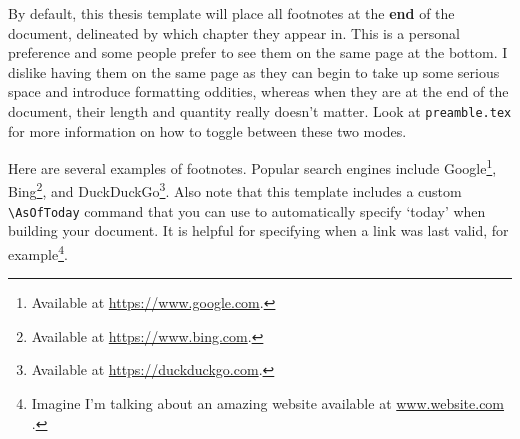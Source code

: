 By default, this thesis template will place all footnotes at the \textbf{end} of the document, delineated by which chapter they appear in.
This is a personal preference and some people prefer to see them on the same page at the bottom.
I dislike having them on the same page as they can begin to take up some serious space and introduce formatting oddities, whereas when they are at the end of the document, their length and quantity really doesn't matter.
Look at \verb|preamble.tex| for more information on how to toggle between these two modes.

Here are several examples of footnotes.
Popular search engines include Google\footnote{Available at \url{https://www.google.com}.}, Bing\footnote{Available at \url{https://www.bing.com}.}, and DuckDuckGo\footnote{Available at \url{https://duckduckgo.com}.}.
Also note that this template includes a custom \verb|\AsOfToday| command that you can use to automatically specify `today' when building your document.
It is helpful for specifying when a link was last valid, for example\footnote{Imagine I'm talking about an amazing website available at \url{www.website.com} \AsOfToday.}.

